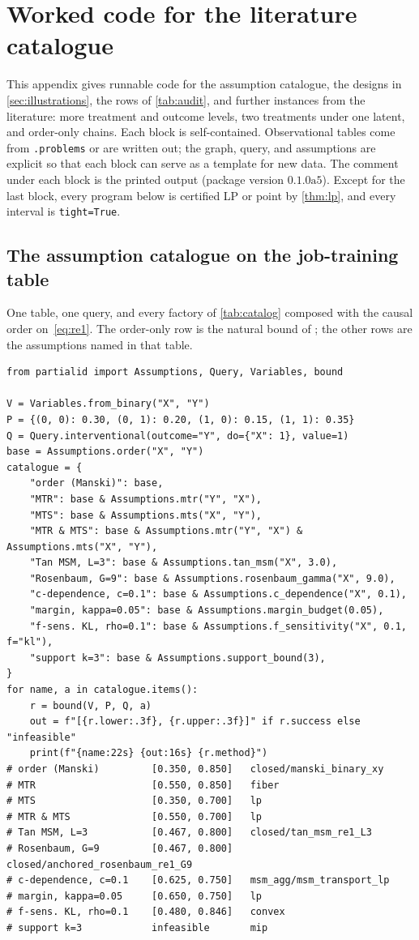 \section{Worked code for the literature catalogue}
\label{app:code}

This appendix gives runnable code for the assumption catalogue, the designs
in \cref{sec:illustrations}, the rows of \cref{tab:audit}, and further
instances from the literature: more treatment and outcome levels, two
treatments under one latent, and order-only chains. Each block is self-contained. Observational
tables come from \pid\texttt{.problems} or are written out; the graph,
query, and assumptions are explicit so that each block can serve as a
template for new data. The comment under each block is the printed output
(package version $0.1.0\mathrm{a}5$). Except for the last block, every
program below is certified LP or point by \cref{thm:lp}, and every interval
is \texttt{tight=True}.

\subsection{The assumption catalogue on the job-training table}
\label{app:code-zoo}

One table, one query, and every factory of \cref{tab:catalog} composed with
the causal order on~\eqref{eq:re1}. The order-only row is the natural bound
of \citet{manski1990nonparametric}; the other rows are the assumptions named
in that table.
\begin{lstlisting}
from partialid import Assumptions, Query, Variables, bound

V = Variables.from_binary("X", "Y")
P = {(0, 0): 0.30, (0, 1): 0.20, (1, 0): 0.15, (1, 1): 0.35}
Q = Query.interventional(outcome="Y", do={"X": 1}, value=1)
base = Assumptions.order("X", "Y")
catalogue = {
    "order (Manski)": base,
    "MTR": base & Assumptions.mtr("Y", "X"),
    "MTS": base & Assumptions.mts("X", "Y"),
    "MTR & MTS": base & Assumptions.mtr("Y", "X") & Assumptions.mts("X", "Y"),
    "Tan MSM, L=3": base & Assumptions.tan_msm("X", 3.0),
    "Rosenbaum, G=9": base & Assumptions.rosenbaum_gamma("X", 9.0),
    "c-dependence, c=0.1": base & Assumptions.c_dependence("X", 0.1),
    "margin, kappa=0.05": base & Assumptions.margin_budget(0.05),
    "f-sens. KL, rho=0.1": base & Assumptions.f_sensitivity("X", 0.1, f="kl"),
    "support k=3": base & Assumptions.support_bound(3),
}
for name, a in catalogue.items():
    r = bound(V, P, Q, a)
    out = f"[{r.lower:.3f}, {r.upper:.3f}]" if r.success else "infeasible"
    print(f"{name:22s} {out:16s} {r.method}")
# order (Manski)         [0.350, 0.850]   closed/manski_binary_xy
# MTR                    [0.550, 0.850]   fiber
# MTS                    [0.350, 0.700]   lp
# MTR & MTS              [0.550, 0.700]   lp
# Tan MSM, L=3           [0.467, 0.800]   closed/tan_msm_re1_L3
# Rosenbaum, G=9         [0.467, 0.800]   closed/anchored_rosenbaum_re1_G9
# c-dependence, c=0.1    [0.625, 0.750]   msm_agg/msm_transport_lp
# margin, kappa=0.05     [0.650, 0.750]   lp
# f-sens. KL, rho=0.1    [0.480, 0.846]   convex
# support k=3            infeasible       mip
\end{lstlisting}

